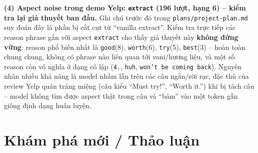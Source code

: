 \documentclass[11pt,a4paper]{article}
\begin{document}
\textbf{(4) Aspect noise trong demo Yelp: \texttt{extract} (196 lượt, hạng
6) -- kiểm tra lại giả thuyết ban đầu.} Ghi chú trước đó trong
\texttt{plans/\allowbreak project-\allowbreak plan.md} suy đoán đây là phần bị cắt cụt từ
``vanilla extract''. Kiểm tra trực tiếp các reason phrase gắn với aspect
\texttt{extract} cho thấy giả thuyết này \textbf{không đứng vững}: reason
phổ biến nhất là \texttt{good}(8), \texttt{worth}(6), \texttt{try}(5),
\texttt{best}(3) -- hoàn toàn chung chung, không có phrase nào liên quan
tới vani/hương liệu, và một số reason còn vô nghĩa ở dạng cô lập
(\texttt{4.}, \texttt{huh}, \texttt{won't be coming back}). Nguyên nhân
nhiều khả năng là model nhầm lẫn trên các câu ngắn/rời rạc, đặc thù của
review Yelp quán tráng miệng (câu kiểu ``Must try!'', ``Worth it.'') khi
bị tách câu -- model không tìm được aspect thật trong câu và ``bám'' vào
một token gần giống định dạng huấn luyện.


\clearpage
\section{Khám phá mới / Thảo luận}
\label{sec:findings}
\end{document}
